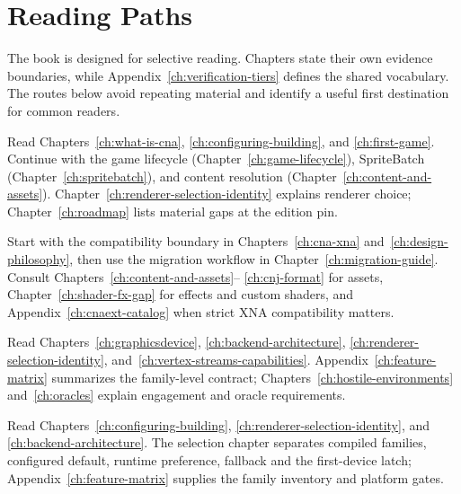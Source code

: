 \chapter*{Reading Paths}

The book is designed for selective reading. Chapters state their own evidence boundaries, while
Appendix~\ref{ch:verification-tiers} defines the shared vocabulary. The routes below avoid
repeating material and identify a useful first destination for common readers.

\begin{description}[style=nextline,leftmargin=3.2cm,labelwidth=2.8cm]
  \item[New CNA user]
    Read Chapters~\ref{ch:what-is-cna}, \ref{ch:configuring-building}, and
    \ref{ch:first-game}. Continue with the game lifecycle (Chapter~\ref{ch:game-lifecycle}),
    SpriteBatch (Chapter~\ref{ch:spritebatch}), and content resolution
    (Chapter~\ref{ch:content-and-assets}). Chapter~\ref{ch:renderer-selection-identity} explains renderer
    choice; Chapter~\ref{ch:roadmap} lists material gaps at the edition pin.

  \item[XNA or FNA porter]
    Start with the compatibility boundary in Chapters~\ref{ch:cna-xna}
    and~\ref{ch:design-philosophy}, then use the migration workflow in
    Chapter~\ref{ch:migration-guide}. Consult Chapters~\ref{ch:content-and-assets}--
    \ref{ch:cnj-format} for assets, Chapter~\ref{ch:shader-fx-gap} for effects and custom
    shaders, and Appendix~\ref{ch:cnaext-catalog} when strict XNA compatibility matters.

  \item[Renderer implementer]
    Read Chapters~\ref{ch:graphicsdevice}, \ref{ch:backend-architecture},
    \ref{ch:renderer-selection-identity}, and~\ref{ch:vertex-streams-capabilities}. Appendix~\ref{ch:feature-matrix}
    summarizes the family-level contract; Chapters~\ref{ch:hostile-environments}
    and~\ref{ch:oracles} explain engagement and oracle requirements.

  \item[Runtime renderer user]
    Read Chapters~\ref{ch:configuring-building}, \ref{ch:renderer-selection-identity}, and
    \ref{ch:backend-architecture}. The selection chapter separates compiled families, configured
    default, runtime preference, fallback and the first-device latch; Appendix~\ref{ch:feature-matrix}
    supplies the family inventory and platform gates.


\end{description}
